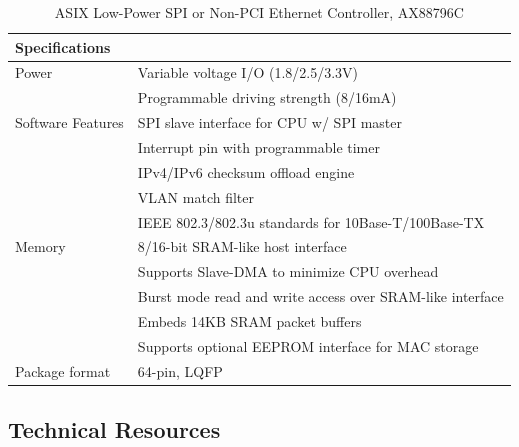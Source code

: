 \begin{table}
    \centering
    \caption{ASIX Low-Power SPI or Non-PCI Ethernet Controller, AX88796C \autocite{AX88796CPdfAX88796C}}
    \label{table:AX88796C}%
    \begin{tabular}{|p{4cm}|p{12cm}|}
      \hline\rowcolor{gray!30}

      \textbf{Specifications} &  \\
      \hline
  
      Power & Variable voltage I/O (1.8/2.5/3.3V) \\
      & Programmable driving strength (8/16mA) \\
      \hline

      Software Features & SPI slave interface for CPU w/ SPI master \\
      & Interrupt pin with programmable timer \\
      & IPv4/IPv6 checksum offload engine \\
      & VLAN match filter \\
      & IEEE 802.3/802.3u standards for 10Base-T/100Base-TX \\
      \hline
  
      Memory & 8/16-bit SRAM-like host interface \\
      & Supports Slave-DMA to minimize CPU overhead \\
      & Burst mode read and write access over SRAM-like interface \\
      & Embeds 14KB SRAM packet buffers \\
      & Supports optional EEPROM interface for MAC storage \\
      \hline
   
      Package format & 64-pin, LQFP \\
      \hline
  
    \end{tabular}
\end{table}


\subsection{Technical Resources} \label{technicalresources}




